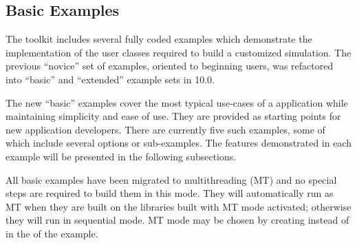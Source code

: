 \label{sec:basicexamples}
\subsection{\textbf{Basic Examples}}
The \Gfour{} toolkit includes several fully coded examples which demonstrate the 
implementation of the user classes required to build a customized simulation.
The previous ``novice'' set of examples, oriented to beginning users, was 
refactored into ``basic'' and ``extended'' example sets in \Gfour{} 10.0.

The new ``basic'' examples cover the most typical use-cases of a \Gfour{} 
application while maintaining simplicity and ease of use.  They are provided as 
starting points for new application developers.  There are currently five such
examples, some of which include several options or sub-examples.  The features
demonstrated in each example will be presented in the following subsections.

All basic examples have been migrated to multithreading (MT) and no special 
steps are required to build them in this mode.  They will automatically run as
MT when they are built on the \Gfour{} libraries built with MT mode activated; 
otherwise they will run in sequential mode.  MT mode may be chosen by creating 
 instead of  in the 
of the example.



